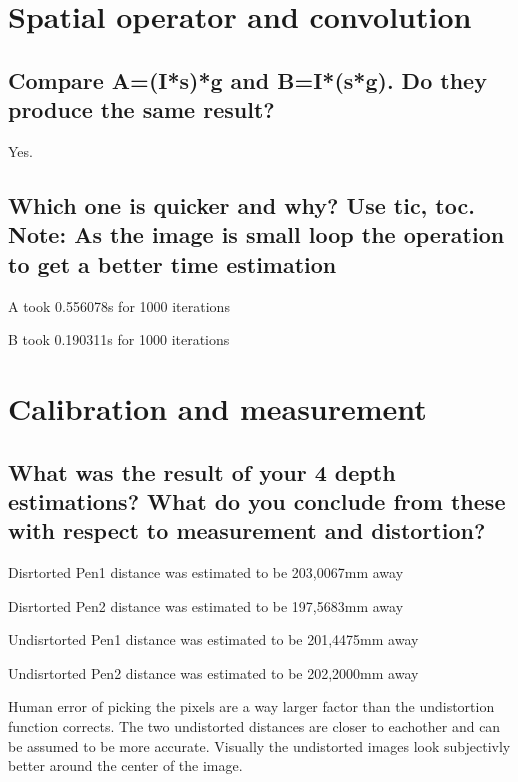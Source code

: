\section{Spatial operator and convolution}
\subsection{Compare A=(I*s)*g and B=I*(s*g). Do they produce the same result?}
Yes.
\subsection{Which one is quicker and why? Use tic, toc. Note: As the image is small loop the operation to get a better time estimation}
A took 0.556078s for 1000 iterations

B took 0.190311s for 1000 iterations
\section{Calibration and measurement}
\subsection{What was the result of your 4 depth estimations? What do you conclude from these with respect to measurement and distortion?}
Disrtorted Pen1 distance was estimated to be 203,0067mm away

Disrtorted Pen2 distance was estimated to be 197,5683mm away

Undisrtorted Pen1 distance was estimated to be 201,4475mm away

Undisrtorted Pen2 distance was estimated to be 202,2000mm away

Human error of picking the pixels are a way larger factor than the undistortion function corrects. The two undistorted distances are closer to eachother and can be assumed to be more accurate. Visually the undistorted images look subjectivly better around the center of the image.
